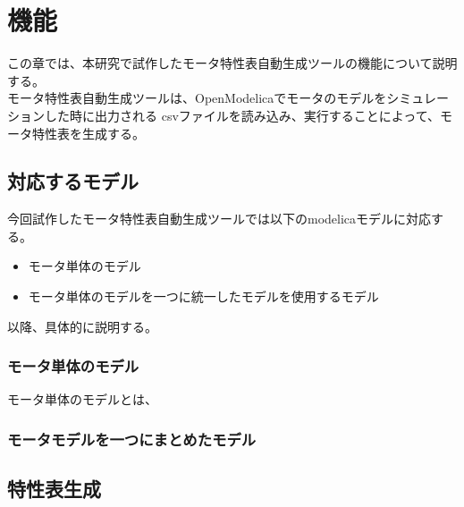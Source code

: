 \chapter{機能}\label{cha:Function}

この章では、本研究で試作したモータ特性表自動生成ツールの機能について説明する。\\
モータ特性表自動生成ツールは、OpenModelicaでモータのモデルをシミュレーションした時に出力される
csvファイルを読み込み、実行することによって、モータ特性表を生成する。\\

\section{対応するモデル}\label{pre_kinou}
今回試作したモータ特性表自動生成ツールでは以下のmodelicaモデルに対応する。
\begin{itemize}
	\item モータ単体のモデル
	\item モータ単体のモデルを一つに統一したモデルを使用するモデル
\end{itemize}
以降、具体的に説明する。

\subsection{モータ単体のモデル}\label{sec:sub1}
モータ単体のモデルとは、

\subsection{モータモデルを一つにまとめたモデル}\label{sec:sub2}






\section{特性表生成}\label{kenkyu_mokuteki}


